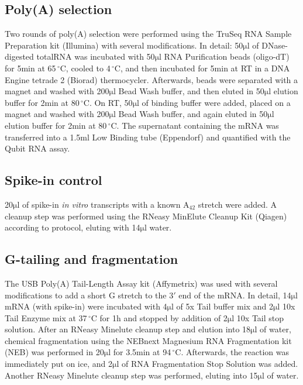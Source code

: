 \documentclass[10pt]{article}
\newcommand{\mul}{\ensuremath{\mathrm{\mu l}}}
\newcommand{\C}{\,$^{\circ}\mathrm{C}$}
\begin{document}
\subsection*{Poly(A) selection}

Two rounds of poly(A) selection were performed using the TruSeq RNA Sample Preparation kit (Illumina) with several modifications. In detail: 50{\mul} of DNase-digested totalRNA was incubated with 50{\mul} RNA Purification beads (oligo-dT) for 5min at 65{\C}, cooled to 4{\C}, and then incubated for 5min at RT in a DNA Engine tetrade 2 (Biorad) thermocycler. Afterwards, beads were separated with a magnet and washed with 200{\mul} Bead Wash buffer, and then eluted in 50{\mul} elution buffer for 2min at 80{\C}. On RT, 50{\mul} of binding buffer were added, placed on a magnet and washed with 200{\mul} Bead Wash buffer, and again eluted in 50{\mul} elution buffer for 2min at 80{\C}. The supernatant containing the mRNA was transferred into a 1.5ml Low Binding tube (Eppendorf) and quantified with the Qubit RNA assay.

\subsection*{Spike-in control}

20{\mul} of spike-in \textit{in vitro} transcripts with a known A$_{42}$ stretch \cite{pelechano13} were added. 
A cleanup step was performed using the RNeasy MinElute Cleanup Kit (Qiagen) according to protocol, eluting with 14{\mul} water.

\subsection*{G-tailing and fragmentation}

The USB Poly(A) Tail-Length Assay kit (Affymetrix) was used with several modifications to add a short G stretch to the $3'$ end of the mRNA. In detail, 14{\mul} mRNA (with spike-in) were incubated with 4{\mul} of 5x Tail buffer mix and 2{\mul} 10x Tail Enzyme mix at 37{\C} for 1h and stopped by addition of 2{\mul} 10x Tail stop solution. After an RNeasy Minelute cleanup step and elution into 18{\mul} of water, chemical fragmentation using the NEBnext Magnesium RNA Fragmentation kit (NEB) was performed in 20{\mul} for 3.5min at 94{\C}. Afterwards, the reaction was immediately put on ice, and 2{\mul} of RNA Fragmentation Stop Solution was added. Another RNeasy Minelute cleanup step was performed, eluting into 15{\mul} of water.
\end{document}
